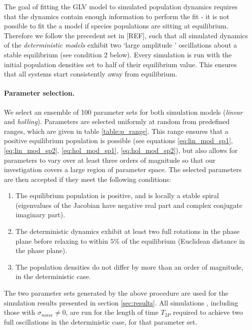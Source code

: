 The goal of fitting the GLV model to simulated population dynamics requires that the dynamics contain enough information to perform the fit - it is not possible to fit the a model if species populations are sitting at equilibrium. Therefore we follow the precedent set in [REF], such that all simulated dynamics of the \emph{deterministic models} exhibit two `large amplitude ' oscillations about a stable equilibrium (see condition 2 below). Every simulation is run with the initial population densities set to half of their equilibrium value. This ensures that all systems start consistently away from equilibrium.

\paragraph*{Parameter selection.} We select an ensemble of 100 parameter sets for both simulation models (\emph{linear} and \emph{holling}). Parameters are selected uniformly at random from predefined ranges, which are given in table \ref{table:p_range}. This range ensures that a positive equilibrium population is possible (see equations \ref{eq:lin_mod_sp1}, \ref{eq:lin_mod_sp2}, \ref{eq:hol_mod_sp1}, \ref{eq:hol_mod_sp2}), but also allows for parameters to vary over at least three orders of magnitude so that our investigation covers a large region of parameter space. The selected parameters are then accepted if they meet the following conditions:

\begin{enumerate}
	\item The equilibrium population is positive, and is locally a stable spiral (eigenvalues of the Jacobian have negative real part and complex conjugate imaginary part).
	\item The deterministic dynamics exhibit at least two full rotations in the phase plane before relaxing to within $5\%$ of the equilibrium (Euclidean distance in the phase plane).
	\item The population densities do not differ by more than an order of magnitude, in the deterministic case.
\end{enumerate}

The two parameter sets generated by the above procedure are used for the simulation results presented in section \ref{sec:results}. All simulations , including those with $\sigma_{noise} \neq 0$, are run for the length of time $T_{2P}$ required to achieve two full oscillations in the deterministic case, for that parameter set.

